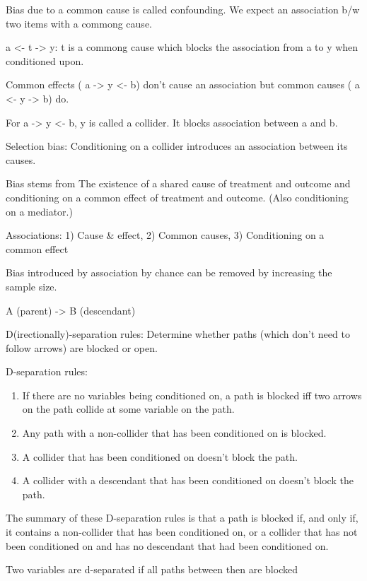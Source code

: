 \documentclass[]{book}
\begin{document}
Bias due to a common cause is called confounding. We expect an
association b/w two items with a commong cause.

a \textless{}- t -\textgreater{} y: t is a commong cause which blocks
the association from a to y when conditioned upon.

Common effects ( a -\textgreater{} y \textless{}- b) don't cause an
association but common causes ( a \textless{}- y -\textgreater{} b) do.

For a -\textgreater{} y \textless{}- b, y is called a collider. It
blocks association between a and b.

Selection bias: Conditioning on a collider introduces an association
between its causes.

Bias stems from The existence of a shared cause of treatment and outcome
and conditioning on a common effect of treatment and outcome. (Also
conditioning on a mediator.)

Associations: 1) Cause \& effect, 2) Common causes, 3) Conditioning on a
common effect

Bias introduced by association by chance can be removed by increasing
the sample size.

A (parent) -\textgreater{} B (descendant)

D(irectionally)-separation rules: Determine whether paths (which don't
need to follow arrows) are blocked or open.

D-separation rules:

\begin{enumerate}
\def\labelenumi{\arabic{enumi}.}
\item
  If there are no variables being conditioned on, a path is blocked iff
  two arrows on the path collide at some variable on the path.
\item
  Any path with a non-collider that has been conditioned on is blocked.
\item
  A collider that has been conditioned on doesn't block the path.
\item
  A collider with a descendant that has been conditioned on doesn't
  block the path.
\end{enumerate}

The summary of these D-separation rules is that a path is blocked if,
and only if, it contains a non-collider that has been conditioned on, or
a collider that has not been conditioned on and has no descendant that
had been conditioned on.

Two variables are d-separated if all paths between then are blocked
\end{document}
